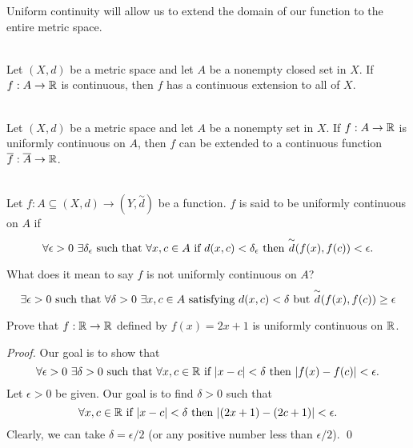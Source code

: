Uniform continuity will allow us to extend the domain of our function to the entire metric space.

\begin{theorem} \leavevmode \\
    Let $(X,d)$ be a metric space and let $A$ be a nonempty closed set in $X$. If $f:A\to \mathbb{R}$ is continuous, then $f$ has a continuous extension to all of $X$.
\end{theorem}

\begin{theorem} \leavevmode \\
    Let $(X,d)$ be a metric space and let $A$ be a nonempty set in $X$. If $f:A\to \mathbb{R}$ is uniformly continuous on $A$, then $f$ can be extended to a continuous function $\overline{f} : \overline{A} \to \mathbb{R}$.
\end{theorem}

\begin{definition}  \leavevmode \\
    Let $f: A \subseteq (X,d) \to (Y, \overset{\sim}{d})$ be a function. $f$ is said to be uniformly continuous on $A$ if 
    $$\forall \epsilon > 0 ~\exists \delta_\epsilon \text{ such that } \forall x, c \in A \text{ if $d(x,c) < \delta_\epsilon$ then $\overset{\sim}{d}(f(x), f(c)) < \epsilon.$}$$
\end{definition}

\begin{note}
    What does it mean to say $f$ is not uniformly continuous on $A$?
    $$\exists \epsilon > 0 \text{ such that } \forall \delta > 0 ~\exists x,c \in A \text{ satisfying $d(x,c) < \delta$ but $\overset{\sim}{d}(f(x),f(c)) \geq \epsilon$}$$
\end{note}

\begin{example}
    Prove that $f: \mathbb{R} \to \mathbb{R}$ defined by $f(x) = 2x+1$ is uniformly continuous on $\mathbb{R}$.
\end{example}

\begin{proof}
    Our goal is to show that 
    $$\forall \epsilon > 0 ~\exists \delta > 0 \text{ such that } \forall x,c \in \mathbb{R} \text{ if $|x-c| < \delta$ then $|f(x) - f(c)| < \epsilon$.}$$
    Let $\epsilon > 0$ be given. Our goal is to find $\delta > 0$ such that 
    $$\forall x,c \in \mathbb{R} \text{ if $|x-c| < \delta$ then $|(2x+1) - (2c+1)| < \epsilon.$}$$
    Clearly, we can take $\delta = \epsilon / 2$ (or any positive number less than $\epsilon / 2$). \qed
\end{proof}


